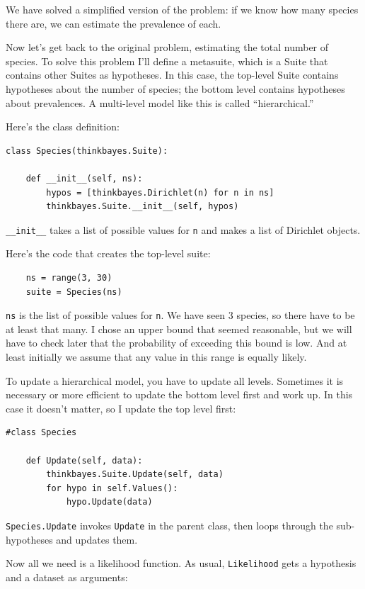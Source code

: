 \documentclass[12pt]{book}
\begin{document}
We have solved a simplified version of the problem: if we
know how many species there are, we can estimate the prevalence
of each.

Now let's get back to the original problem, estimating the total
number of species.  To solve this problem I'll define a metasuite,
which is a Suite that contains other Suites as hypotheses.  In this
case, the top-level Suite contains hypotheses about the number of
species; the bottom level contains hypotheses about prevalences.
A multi-level model like this is called ``hierarchical.''

Here's the class definition:

\begin{verbatim}
class Species(thinkbayes.Suite):

    def __init__(self, ns):
        hypos = [thinkbayes.Dirichlet(n) for n in ns]
        thinkbayes.Suite.__init__(self, hypos)
\end{verbatim}

\verb"__init__" takes a list of possible values for {\tt n} and
makes a list of Dirichlet objects.

Here's the code that creates the top-level suite:

\begin{verbatim}
    ns = range(3, 30)
    suite = Species(ns)
\end{verbatim}

{\tt ns} is the list of possible values for {\tt n}.  We have seen 3
species, so there have to be at least that many.  I chose an upper
bound that seemed reasonable, but we will have to check later that the
probability of exceeding this bound is low.  And at least initially
we assume that any value in this range is equally likely.

To update a hierarchical model, you have to update all levels.
Sometimes it is necessary or more efficient to update the bottom
level first and work up.  In this case it doesn't matter, so
I update the top level first:

\begin{verbatim}
#class Species

    def Update(self, data):
        thinkbayes.Suite.Update(self, data)
        for hypo in self.Values():
            hypo.Update(data)
\end{verbatim}

{\tt Species.Update} invokes {\tt Update} in the parent class,
then loops through the sub-hypotheses and updates them.

Now all we need is a likelihood function.  As usual,
{\tt Likelihood} gets a hypothesis and a dataset as arguments:
\end{document}
